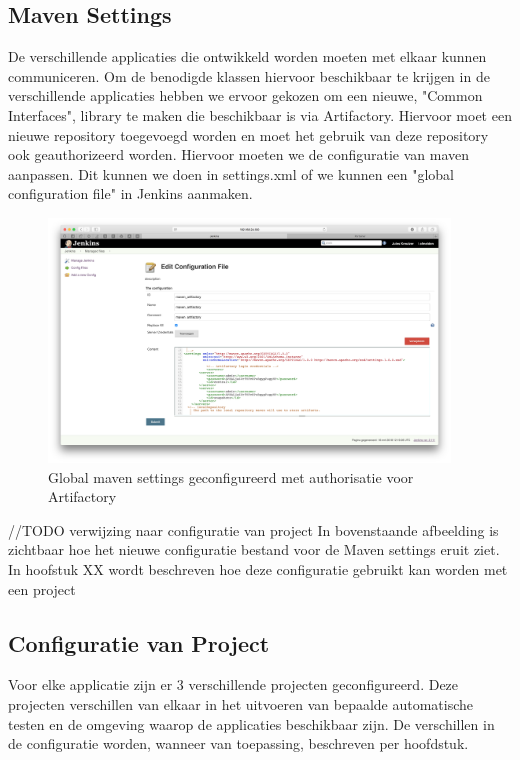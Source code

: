 \newpage
\subsection{Maven Settings}
De verschillende applicaties die ontwikkeld worden moeten met elkaar kunnen communiceren. Om de benodigde klassen hiervoor beschikbaar te krijgen in de verschillende applicaties hebben we ervoor gekozen om een nieuwe, "Common Interfaces", library te maken die beschikbaar is via Artifactory. 
Hiervoor moet een nieuwe repository toegevoegd worden en moet het gebruik van deze repository ook geauthorizeerd worden. Hiervoor moeten we de configuratie van maven aanpassen. Dit kunnen we doen in settings.xml of we kunnen een "global configuration file" in Jenkins aanmaken.

\begin{figure}[H]
	\centering
	\includegraphics[width=0.95\textwidth]{img/MavenSettings.png}
	\caption{Global maven settings geconfigureerd met authorisatie voor Artifactory}
	\label{fig:MavenSettings}
\end{figure}
//TODO verwijzing naar configuratie van project
In bovenstaande afbeelding is zichtbaar hoe het nieuwe configuratie bestand voor de Maven settings eruit ziet. In hoofstuk XX wordt beschreven hoe deze configuratie gebruikt kan worden met een project

\subsection{Configuratie van Project}
Voor elke applicatie zijn er 3 verschillende projecten geconfigureerd. Deze projecten verschillen van elkaar in het uitvoeren van bepaalde automatische testen en de omgeving waarop de applicaties beschikbaar zijn. De verschillen in de configuratie worden, wanneer van toepassing, beschreven per hoofdstuk.
\newpage
